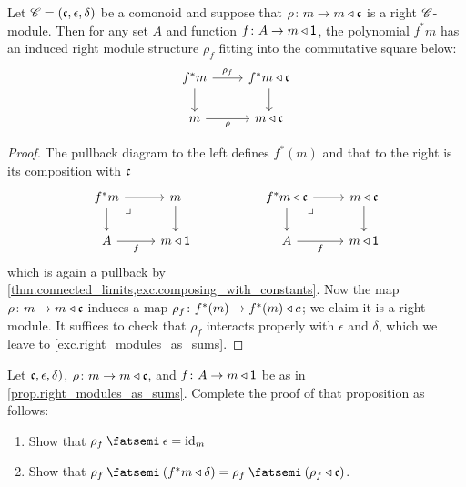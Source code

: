 \documentclass[DynamicalBook]{subfiles}
\begin{document}
\begin{proposition}\label{prop.right_modules_as_sums}
Let $\mathscr{C}=(\mathfrak{c},\epsilon,\delta)$ be a comonoid and suppose that $\rho\colon m\to m\mathbin{\triangleleft}\mathfrak{c}$ is a right $\mathscr{C}$-module. Then for any set $A$ and function $f\colon A\to m\mathbin{\triangleleft}\textsf{1}$, the polynomial $f^*m$ has an induced right module structure $\rho_f$ fitting into the commutative square below:
\[
\begin{tikzcd}
  f^*m\ar[d]\ar[r, "\rho_f"]&
  f^*m\tri\ema{c}\ar[d]\\
  m\ar[r, "\rho"']&
  m\tri\ema{c}
\end{tikzcd}
\]
\end{proposition}
\begin{proof}
The pullback diagram to the left defines $f^*(m)$ and that to the right is its composition with $\mathfrak{c}$
\[
\begin{tikzcd}
	f^*m\ar[r]\ar[d]&
	m\ar[d]\\
	A\ar[r, "f"']&
	m\tri\1\ar[ul, phantom, very near end, "\lrcorner"]
\end{tikzcd}
\hspace{.7in}
\begin{tikzcd}
	f^*m\tri\ema{c}\ar[r]\ar[d]&
	m\tri\ema{c}\ar[d]\\
	A\ar[r, "f"']&
	m\tri\1\ar[ul, phantom, very near end, "\lrcorner"]
\end{tikzcd}
\]
which is again a pullback by \cref{thm.connected_limits,exc.composing_with_constants}. Now the map $\rho\colon m\to m\mathbin{\triangleleft}\mathfrak{c}$ induces a map $\rho_f\colon f^*(m)\to f^*(m)\mathbin{\triangleleft} c$; we claim it is a right module. It suffices to check that $\rho_f$ interacts properly with $\epsilon$ and $\delta$, which we leave to \cref{exc.right_modules_as_sums}.
\end{proof}

\begin{exercise}\label{exc.right_modules_as_sums}
Let $\mathfrak{c},\epsilon,\delta)$, $\rho\colon m\to m\mathbin{\triangleleft}\mathfrak{c}$, and $f\colon A\to m\mathbin{\triangleleft}\textsf{1}$ be as in \cref{prop.right_modules_as_sums}. Complete the proof of that proposition as follows:
\begin{enumerate}
	\item Show that $\rho_f\then\epsilon=\id_m$
	\item Show that $\rho_f\then(f^*m\tri\delta)=\rho_f\then(\rho_f\tri\ema{c})$.
\qedhere
\end{enumerate}
\end{exercise}
\end{document}
